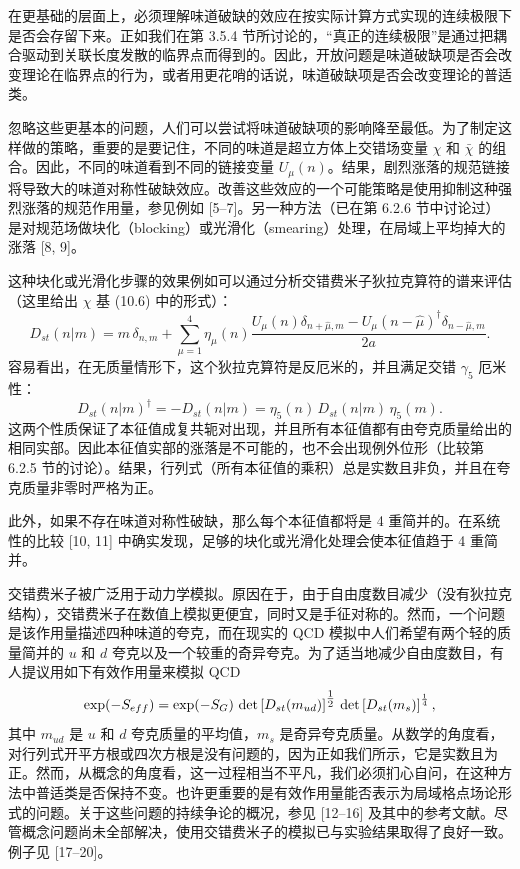 在更基础的层面上，必须理解味道破缺的效应在按实际计算方式实现的连续极限下是否会存留下来。正如我们在第 3.5.4 节所讨论的，“真正的连续极限”是通过把耦合驱动到关联长度发散的临界点而得到的。因此，开放问题是味道破缺项是否会改变理论在临界点的行为，或者用更花哨的话说，味道破缺项是否会改变理论的普适类。

忽略这些更基本的问题，人们可以尝试将味道破缺项的影响降至最低。为了制定这样做的策略，重要的是要记住，不同的味道是超立方体上交错场变量 $\chi$ 和 $\bar\chi$ 的组合。因此，不同的味道看到不同的链接变量 $U_\mu(n)$。结果，剧烈涨落的规范链接将导致大的味道对称性破缺效应。改善这些效应的一个可能策略是使用抑制这种强烈涨落的规范作用量，参见例如 [5--7]。另一种方法（已在第 6.2.6 节中讨论过）是对规范场做块化（blocking）或光滑化（smearing）处理，在局域上平均掉大的涨落 [8, 9]。

这种块化或光滑化步骤的效果例如可以通过分析交错费米子狄拉克算符的谱来评估（这里给出 $\chi$ 基 (10.6) 中的形式）：
\begin{equation}
  D_{st}(n|m) = m\,\delta_{n,m} +
  \sum_{\mu=1}^{4} \eta_\mu(n)
  \frac{U_\mu(n)\delta_{n+\hat\mu,m}
  - U_\mu(n-\hat\mu)^{\dagger}\delta_{n-\hat\mu,m}}{2a} .
\end{equation}
容易看出，在无质量情形下，这个狄拉克算符是反厄米的，并且满足交错 $\gamma_5$ 厄米性：
\begin{equation}
  D_{st}(n|m)^{\dagger} = -D_{st}(n|m) =
  \eta_5(n)\,D_{st}(n|m)\,\eta_5(m) .
\end{equation}
这两个性质保证了本征值成复共轭对出现，并且所有本征值都有由夸克质量给出的相同实部。因此本征值实部的涨落是不可能的，也不会出现例外位形（比较第 6.2.5 节的讨论）。结果，行列式（所有本征值的乘积）总是实数且非负，并且在夸克质量非零时严格为正。

此外，如果不存在味道对称性破缺，那么每个本征值都将是 4 重简并的。在系统性的比较 [10, 11] 中确实发现，足够的块化或光滑化处理会使本征值趋于 4 重简并。

交错费米子被广泛用于动力学模拟。原因在于，由于自由度数目减少（没有狄拉克结构），交错费米子在数值上模拟更便宜，同时又是手征对称的。然而，一个问题是该作用量描述四种味道的夸克，而在现实的 QCD 模拟中人们希望有两个轻的质量简并的 $u$ 和 $d$ 夸克以及一个较重的奇异夸克。为了适当地减少自由度数目，有人提议用如下有效作用量来模拟 QCD
\begin{equation}
  \exp(-S_{eff}) = \exp(-S_G)\,
  \det\left[D_{st}(m_{ud})\right]^{\tfrac{1}{2}}\,
  \det\left[D_{st}(m_s)\right]^{\frac{1}{4}} ,
\end{equation}
其中 $m_{ud}$ 是 $u$ 和 $d$ 夸克质量的平均值，$m_s$ 是奇异夸克质量。从数学的角度看，对行列式开平方根或四次方根是没有问题的，因为正如我们所示，它是实数且为正。然而，从概念的角度看，这一过程相当不平凡，我们必须扪心自问，在这种方法中普适类是否保持不变。也许更重要的是有效作用量能否表示为局域格点场论形式的问题。关于这些问题的持续争论的概况，参见 [12--16] 及其中的参考文献。尽管概念问题尚未全部解决，使用交错费米子的模拟已与实验结果取得了良好一致。例子见 [17--20]。

